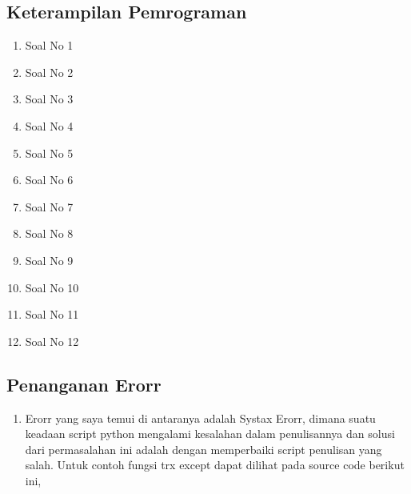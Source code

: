 \subsection{Keterampilan Pemrograman}
\begin{enumerate}

\item Soal No 1 

\item Soal No 2 

\item Soal No 3 

\item Soal No 4 

\item Soal No 5 

\item Soal No 6 

\item Soal No 7 

\item Soal No 8 

\item Soal No 9 

\item Soal No 10 

\item Soal No 11 

\item Soal No 12 
\end{enumerate}

\subsection{Penanganan Erorr}
\begin{enumerate}

\item Erorr yang saya temui di antaranya adalah Systax Erorr, dimana suatu keadaan script python mengalami kesalahan dalam penulisannya dan solusi dari permasalahan ini adalah dengan memperbaiki script penulisan yang salah. Untuk contoh fungsi trx except dapat dilihat pada source code berikut ini,

	

\end{enumerate}

